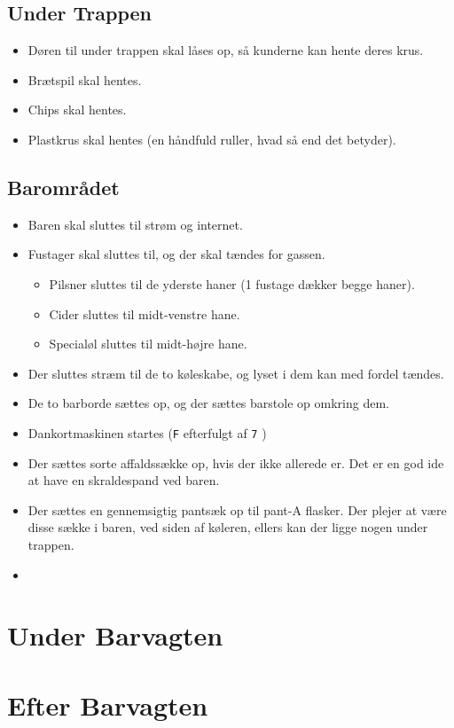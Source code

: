 \subsection{Under Trappen}
\label{sec:pre:under-trappen}

\begin{itemize}
\item Døren til under trappen skal låses op, så kunderne kan hente
  deres krus.
\item Brætspil skal hentes.
\item Chips skal hentes.
\item Plastkrus skal hentes (en håndfuld ruller, hvad så end det
  betyder).
\end{itemize}

\subsection{Barområdet}
\label{sec:pre:baromradet}

\begin{itemize}
\item Baren skal sluttes til strøm og internet.
\item Fustager skal sluttes til, og der skal tændes for
  gassen.
  \begin{itemize}
  \item Pilsner sluttes til de yderste haner (1 fustage dækker begge
    haner).
  \item Cider sluttes til midt-venstre hane.
  \item Specialøl sluttes til midt-højre hane.
  \end{itemize}
\item Der sluttes stræm til de to køleskabe, og lyset i dem kan med
  fordel tændes.
\item De to barborde sættes op, og der sættes barstole op omkring dem.
\item Dankortmaskinen startes (\texttt{F} efterfulgt af
  \texttt{7} %
  )
\item Der sættes sorte affaldssække op, hvis der ikke allerede er. Det
  er en god ide at have en skraldespand ved baren.
\item Der sættes en gennemsigtig pantsæk op til pant-A flasker. Der
  plejer at være disse sække i baren, ved siden af køleren, ellers kan
  der ligge nogen under trappen.
\item %
\end{itemize}

\section{Under Barvagten}
\label{sec:intra-barvagten}


\section{Efter Barvagten}
\label{sec:post-barvagten}




